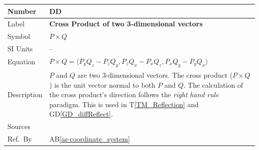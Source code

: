 \documentclass[12pt]{article}
\newcommand{\colAwidth}{0.13\textwidth}
\newcommand{\colBwidth}{0.82\textwidth}
\newcounter{defnum} %
\newcommand{\dref}[1]{GD\ref{#1}}
\newcounter{datadefnum} %
\newcommand{\tref}[1]{T\ref{#1}}
\newcommand{\aBref}[1]{AB\ref{#1}}
\begin{document}
\noindent
\begin{minipage}{\textwidth}
	\renewcommand*{\arraystretch}{1.5}
	\begin{tabular}{| p{\colAwidth} | p{\colBwidth}|}
		\hline
		\rowcolor[gray]{0.9}
		Number& DD{datadefnum}\thedatadefnum 
		\label{DD_Cross_Product}\\
		\hline
		Label& \bf Cross Product of two 3-dimensional vectors\\
		\hline
		Symbol &$P\times Q$\\
		\hline
		SI Units & --\\
		\hline
		Equation&$P\times Q = \langle P_{y}Q_{z}-P_{z}Q_{y}, 
		P_{z}Q_{x}-P_{x}Q_{z}, P_{x}Q_{y}-P_{y}Q_{x} \rangle$ 
		
          \\
		\hline
		Description & $P$ and $Q$ are two $3$-dimensional vectors. The cross 
		product ($P\times Q$) is the unit vector normal to both $P$ and $Q$. 
		The calculation of the cross product's direction follows the 
		\textit{right hand rule} paradigm. This is used in \tref{TM_Reflection} 
		and \dref{GD_diffReflect}.
		\\
		\hline
		Sources& \cite{Lengyel2003}\\
		\hline
		Ref.\ By & \aBref{as-coordinate_system} \\
		\hline
	\end{tabular}
\end{minipage}\\

~\newline
\end{document}
